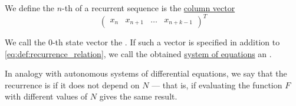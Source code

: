 \begin{definition}
\begin{thmenum}
     We define the \( n \)-th  of a recurrent sequence is the \hyperref[def:array/column_vector]{column vector}
    \begin{equation*}
      \begin{pmatrix}
        x_n & x_{n+1} & \ldots & x_{n+k-1}
      \end{pmatrix}^T
    \end{equation*}

     We call the \( 0 \)-th state vector the . If such a vector is specified in addition to \eqref{eq:def:recurrence_relation}, we call the obtained \hyperref[def:equation/system]{system of equations} an .

     In analogy with autonomous systems of differential equations, we say that the recurrence is  if it does not depend on \( N \) --- that is, if evaluating the function \( F \) with different values of \( N \) gives the same result.
  \end{thmenum}
\end{definition}
